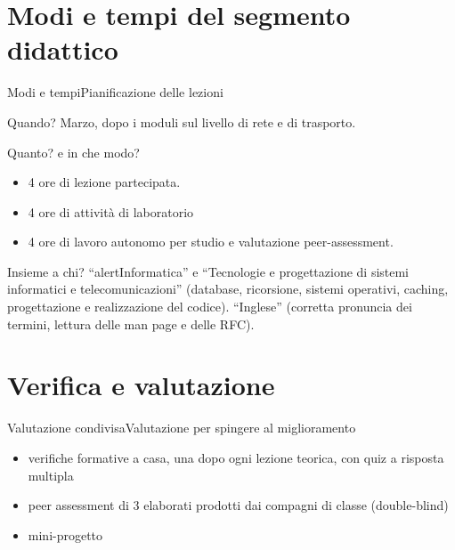 \documentclass[italian]{beamer}
\begin{document}
\section[Modi e tempi]{Modi e tempi del segmento didattico}
\begin{frame}{Modi e tempi}{Pianificazione delle lezioni}
	
	\begin{block}{Quando?}
	Marzo, dopo i moduli sul livello di rete e di trasporto.
	\end{block}
	
	\begin{block}{Quanto? e in che modo?}
	\begin{itemize}
		\item 4 ore di lezione partecipata.
		\item 4 ore di attivit\`a di laboratorio
		\item 4 ore di lavoro autonomo per studio e valutazione peer-assessment.
	\end{itemize}
	\end{block}

	\begin{block}{Insieme a chi?}
		``alert{Informatica}'' e ``\alert{Tecnologie e progettazione di sistemi informatici e telecomunicazioni}'' (database, ricorsione, sistemi operativi, caching, progettazione e realizzazione del codice). ``\alert{Inglese}'' (corretta pronuncia dei termini, lettura delle man page e delle RFC).
	\end{block}
\end{frame}


\section[Verifica e valutazione]{Verifica e valutazione}
\begin{frame}{Valutazione condivisa}{Valutazione per spingere al miglioramento}
	
	\begin{itemize}
		\item verifiche formative a casa, una dopo ogni lezione teorica, con quiz a risposta multipla
		\item peer assessment di 3 elaborati prodotti dai compagni di classe (double-blind)
		\item mini-progetto
	\end{itemize}
	
	\note{%
		
	}%
\end{frame}
\end{document}
